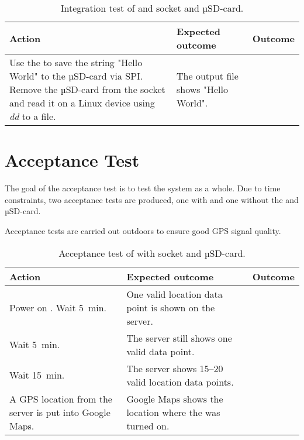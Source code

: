\begin{table}[H]
	\centering
	\begin{tabularx}{\textwidth}{p{4.3cm} X X}
		\toprule
		\textbf{Action} & \textbf{Expected outcome} & \textbf{Outcome} \\
		\midrule
		Use the \MKR to save the string "Hello World" to the µSD-card via SPI.
		Remove the µSD-card from the \SDsock socket and read it on a Linux device using \textit{dd} to a file. & The output file shows "Hello World". & \\
		\bottomrule
	\end{tabularx}
	\caption{Integration test of \MKR and \SDsock socket and µSD-card.}
	\label{AT:intSD}
\end{table}

\section{Acceptance Test}
The goal of the acceptance test is to test the system as a whole.
Due to time constraints, two acceptance tests are produced, one with and one without the \SDsock and µSD-card.

Acceptance tests are carried out outdoors to ensure good GPS signal quality.

\begin{table}[H]
	\centering
	\begin{tabularx}{\textwidth}{p{4.3cm} X X}
		\toprule
		\textbf{Action} & \textbf{Expected outcome} & \textbf{Outcome} \\
		\midrule
		Power on \systemName. Wait \SI{5}{\minute}. & One valid location data point is shown on the server. & \\
		Wait \SI{5}{\minute}. & The server still shows one valid data point. & \\
		Wait \SI{15}{\minute}. & The server shows \numrange{15}{20} valid location data points. & \\
		A GPS location from the server is put into Google Maps. & Google Maps shows the location where the \systemName was turned on. & \\
		\bottomrule
	\end{tabularx}
	\caption{Acceptance test of \systemName with  \SDsock socket and µSD-card.}
	\label{AT:withSD}
\end{table}


